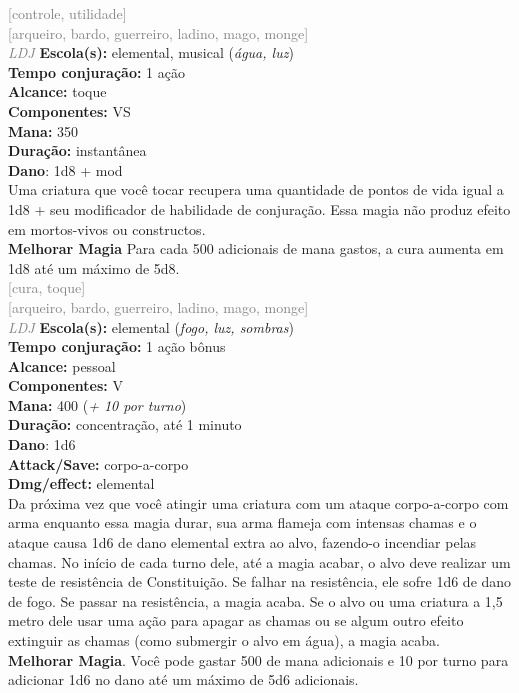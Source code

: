 \documentclass{RPG_Adventure}[2021/10/20]
\begin{document}
{\scriptsize \textcolor{gray}{[controle, utilidade]\\}}
{\scriptsize \textcolor{gray}{[arqueiro, bardo, guerreiro, ladino, mago, monge]\\}}
{\tiny \textcolor{gray}{\textit{LDJ}}}\jump{}
{\small \t \textbf{Escola(s):} elemental, musical (\textit{água, luz})\\\t \textbf{Tempo conjuração:} 1 ação\\\t \textbf{Alcance:} toque\\\t \textbf{Componentes:} VS\\\t \textbf{Mana:} 350\\\t \textbf{Duração:} instantânea\\\t \textbf{Dano}: 1d8 + mod\\}
{\normalsize Uma criatura que você tocar recupera uma quantidade de pontos de vida igual a 1d8 + seu modificador de habilidade de conjuração. Essa magia não produz efeito em mortos-vivos ou constructos.\\\t \textbf{Melhorar Magia} Para cada 500 adicionais de mana gastos, a cura aumenta em 1d8 até um máximo de 5d8.\\}
{\scriptsize \textcolor{gray}{[cura, toque]\\}}
{\scriptsize \textcolor{gray}{[arqueiro, bardo, guerreiro, ladino, mago, monge]\\}}
{\tiny \textcolor{gray}{\textit{LDJ}}}\jump{}
{\small \t \textbf{Escola(s):} elemental (\textit{fogo, luz, sombras})\\\t \textbf{Tempo conjuração:} 1 ação bônus\\\t \textbf{Alcance:} pessoal\\\t \textbf{Componentes:} V\\\t \textbf{Mana:} 400 (\textit{+ 10 por turno})\\\t \textbf{Duração:} concentração, até 1 minuto\\\t \textbf{Dano}: 1d6\\\t \textbf{Attack/Save:} corpo-a-corpo\\\t \textbf{Dmg/effect:} elemental\\}
{\normalsize Da próxima vez que você atingir uma criatura com um ataque corpo-a-corpo com arma enquanto essa magia durar, sua arma flameja com intensas chamas e o ataque causa 1d6 de dano elemental extra ao alvo, fazendo-o incendiar pelas chamas. No início de cada turno dele, até a magia acabar, o alvo deve realizar um teste de resistência de Constituição. Se falhar na resistência, ele sofre 1d6 de dano de fogo. Se passar na resistência, a magia acaba. Se o alvo ou uma criatura a 1,5 metro dele usar uma ação para apagar as chamas ou se algum outro efeito extinguir as chamas (como submergir o alvo em água), a magia acaba.\\\t \textbf{Melhorar Magia}. Você pode gastar 500 de mana adicionais e 10 por turno para adicionar 1d6 no dano até um máximo de 5d6 adicionais.\\}
\end{document}
